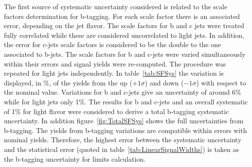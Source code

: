 The first source of systematic uncertainty considered is related to the scale factors determination for b-tagging. For each scale factor there is an associated error, depending on the jet flavor. The scale factors for b and c jets were treated fully correlated while these are considered uncorrelated to light jets. In addition, the error for c-jets scale factors is considered to be the double to the one associated to b-jets. The scale factors for b and c-jets were varied simultaneously within their errors and signal yields were re-computed. The procedure was repeated for light jets independently. In table~\ref{tab:SFSys} the variation is displayed, in \%, of the yields from the up ($+1\sigma$) and down ($-1\sigma$) with respect to the nominal value. Variations for b and c-jets give an uncertainty of around 6\% while for light jets only 1\%. The results for b and c-jets and an overall systematic of 1\% for light flavor were considered to derive a total b-tagging systematic uncertainty. In addition figure~\ref{fig:TotalSFSys} shows the full uncertainties from b-tagging. The yields from b-tagging variations are compatible within errors with nominal yields. Therefore, the highest error between the systematic uncertainty and the statistical error (quoted in table~\ref{tab:LinearSignalWidths}) is taken as the b-tagging uncertainty for limits calculation.

\begin{table*}[htbH]
\begin{center}
\caption{B-tagging uncertainties for signal samples\label{tab:SFSys}}
\end{center}
\end{table*}

